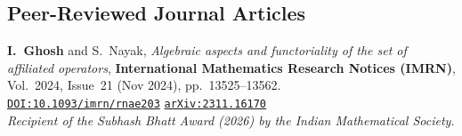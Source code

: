 \documentclass[10pt,a4paper,sans]{moderncv}
\begin{document}
\subsection{Peer-Reviewed Journal Articles}
\begin{enumerate}[label={[\textbf{\color{accentblue}\arabic*}]}, leftmargin=2em, itemsep=0.45em]
    \item \textbf{I.~Ghosh} and S.~Nayak, \emph{Algebraic aspects and functoriality of the set of affiliated operators}, \textbf{International Mathematics Research Notices (IMRN)}, Vol.~2024, Issue~21 (Nov 2024), pp.~13525--13562. \\[0.20em]
    \mbox{\href{https://doi.org/10.1093/imrn/rnae203}{\small\textcolor{accentblue}{\enskip\texttt{DOI:10.1093/imrn/rnae203}}}} \quad\textcolor{color2}{\textbar}\quad \mbox{\href{https://arxiv.org/abs/2311.16170}{\small\textcolor{accentblue}{\enskip\texttt{arXiv:2311.16170}}}} \\[0.20em]
    \small\textcolor{awardgold}{\enskip\emph{Recipient of the Subhash Bhatt Award (2026) by the Indian Mathematical Society.}}
\end{enumerate}
\end{document}
